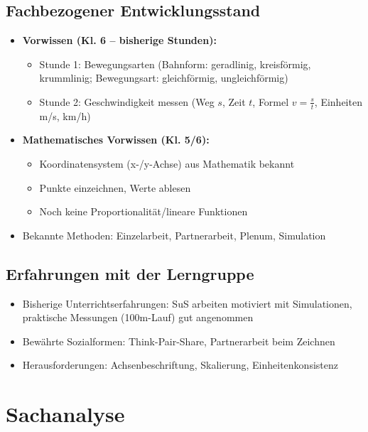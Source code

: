 \documentclass[11pt,a4paper]{article}
\begin{document}
\subsection{Fachbezogener Entwicklungsstand}
\begin{itemize}
    \item \textbf{Vorwissen (Kl. 6 -- bisherige Stunden):}
    \begin{itemize}
        \item Stunde 1: Bewegungsarten (Bahnform: geradlinig, kreisförmig, krummlinig; Bewegungsart: gleichförmig, ungleichförmig)
        \item Stunde 2: Geschwindigkeit messen (Weg $s$, Zeit $t$, Formel $v = \frac{s}{t}$, Einheiten m/s, km/h)
    \end{itemize}
    \item \textbf{Mathematisches Vorwissen (Kl. 5/6):}
    \begin{itemize}
        \item Koordinatensystem (x-/y-Achse) aus Mathematik bekannt
        \item Punkte einzeichnen, Werte ablesen
        \item Noch keine Proportionalität/lineare Funktionen
    \end{itemize}
    \item Bekannte Methoden: Einzelarbeit, Partnerarbeit, Plenum, Simulation
\end{itemize}

\subsection{Erfahrungen mit der Lerngruppe}
\begin{itemize}
    \item Bisherige Unterrichtserfahrungen: SuS arbeiten motiviert mit Simulationen, praktische Messungen (100m-Lauf) gut angenommen
    \item Bewährte Sozialformen: Think-Pair-Share, Partnerarbeit beim Zeichnen
    \item Herausforderungen: Achsenbeschriftung, Skalierung, Einheitenkonsistenz
\end{itemize}

\section{Sachanalyse}
\end{document}
